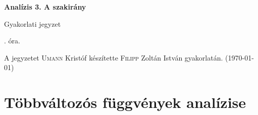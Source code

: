 \documentclass[a4paper,11.5pt]{article}
\begin{document}
	\setlength\parindent{0pt}
	\def\a{\textbf{a}}
	\def\b{\textbf{b}}
	\def\N{\hskip 10 true mm}
	\def\a{\textbf{a}}
	\def\b{\textbf{b}}
	\def\c{\textbf{c}}
	\def\d{\textbf{d}}
	\def\e{\textbf{e}}
	\def\gg{$\gamma$}
	\def\vi{\textbf{i}}
	\def\jj{\textbf{j}}
	\def\kk{\textbf{k}}
	\def\fh{\overrightarrow}
	\def\l{\lambda}
	\def\m{\mu}
	\def\v{\textbf{v}}
	\def\0{\textbf{0}}
	\def\s{\hspace{0.2mm}\vphantom{\beta}}
	\def\Z{\mathbb{Z}}
	\def\Q{\mathbb{Q}}
	\def\R{\mathbb{R}}
	\def\C{\mathbb{C}}
	\def\N{\mathbb{N}}
	\def\Rn{\mathbb{R}^{n}}
	\def\Ra{\overline{\mathbb{R}}}
	\def\sume{\displaystyle\sum_{n=1}^{+\infty}}
	\def\sumn{\displaystyle\sum_{n=0}^{+\infty}}
	\def\biz{\emph{Bizonyítás:\ }}
	\def\narrow{\underset{n\rightarrow+\infty}{\longrightarrow}}
	\def\limn{\displaystyle\lim_{n\to +\infty}}
	
	\theoremstyle{definition}
	\newtheorem{theorem}{Tétel}[subsubsection] %
	
	\theoremstyle{definition}
	\newtheorem{definition}[theorem]{Definíció} %
	\newtheorem{example}[theorem]{Példa} %
	\newtheorem{exercise}[theorem]{Házi feladat} %
	\newtheorem{note}[theorem]{Megjegyzés} %
	\newtheorem{task}[theorem]{Feladat} %
	\newtheorem{revision}[theorem]{Emlékeztető} %
	\begin{center}
		{\LARGE\textbf{Analízis 3. A szakirány}}
		\smallskip
		
		{\Large Gyakorlati jegyzet}
		
		. óra.
	\end{center}
	A jegyzetet \textsc{Umann} Kristóf készítette \textsc{Filipp} Zoltán István gyakorlatán. (\today)
	\section{Többváltozós függvények analízise}
\end{document}

